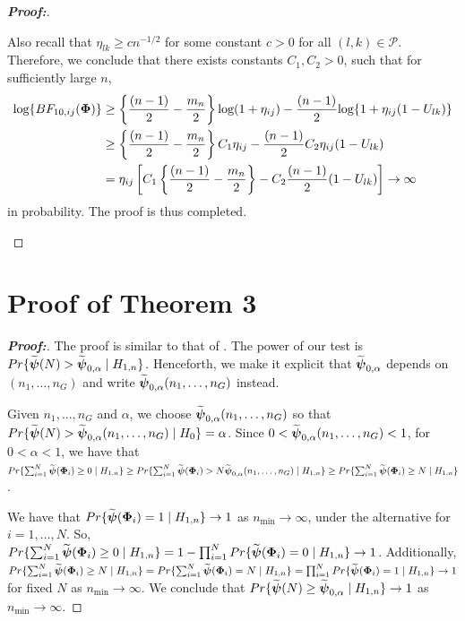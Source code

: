 \documentclass[pdflatex,sn-basic]{sn-jnl}%
\def\log{\hbox{log}}
\def\log{\hbox{log}}
\def\boldpsi{{\mbox{\boldmath $\psi$}}}
\newcommand{\uPhi}              {\mbox{\boldmath$\Phi$}}
\theoremstyle{thmstyleone}%
\theoremstyle{thmstyletwo}%
\theoremstyle{thmstylethree}%
\begin{document}
\begin{appendices}
\begin{proof}[\textbf{\upshape Proof:}]
\begin{description}
{Also recall that $\eta_{lk} \geq cn^{-1/2}$ for some constant $c > 0$ for all $(l,k)\in\mathcal{P}$. Therefore, we conclude that there exists constants $C_1, C_2 > 0$, such that for sufficiently large $n$,
\begin{align*}
    \log\{BF_{10, ij}(\uPhi) \} & \geq \left\{\frac{(n - 1)}{2} - \frac{m_n}{2}\right\}\log(1 + \eta_{ij}) - \frac{(n - 1)}{2}\log\{1 + \eta_{ij}(1 - U_{lk})\}\\
    &\geq \left\{\frac{(n - 1)}{2} - \frac{m_n}{2}\right\}C_1\eta_{ij} - \frac{(n - 1)}{2}C_2\eta_{ij}(1 - U_{lk})\\
    & = \eta_{ij}\left[C_1\left\{\frac{(n - 1)}{2} - \frac{m_n}{2}\right\} - C_2\frac{(n - 1)}{2}(1 - U_{lk})\right]\to \infty
\end{align*}
in probability. The proof is thus completed. 
}

\end{description}
\end{proof}


\section{Proof of Theorem 3} \label{secA2}

\begin{proof}[\textbf{\upshape Proof:}]
The proof is similar to that of \cite{zoh2018powerful}. %
The power of our test is $Pr\{ \widetilde{\boldpsi}(N) > \widetilde{\boldpsi}_{0,\alpha}\mid  H_{1,n}\}$.
Henceforth, we make it explicit that $\widetilde{\boldpsi}_{0,\alpha}$ depends on $(n_1, \ldots ,n_G)$ and write $\widetilde{\boldpsi}_{0,\alpha}(n_1, \ldots, n_G)$ instead.

Given $n_1, \ldots, n_G$ and $\alpha$, we choose $\widetilde{\boldpsi}_{0,\alpha}(n_1, \ldots, n_G)$ so that $Pr\{\widetilde{\boldpsi}(N) > \widetilde{\boldpsi}_{0, \alpha}(n_1, \ldots,n_G)\mid  H_{0}\}  = \alpha$.
Since $ 0 < \widetilde{\boldpsi}_{0,\alpha}(n_1, \ldots,n_G) < 1$, for $0 < \alpha < 1$, we have that $Pr\{ \sum^{N}_{i=1}\widetilde{\boldpsi}(\uPhi_i) \geq 0 \mid H_{1,n} \} \geq Pr\{ \sum^{N}_{i=1}\widetilde{\boldpsi}(\uPhi_i) > N\widetilde{\boldpsi}_{0,\alpha}(n_1, \ldots ,n_G) \mid H_{1,n} \} \geq Pr\{ \sum^{N}_{i=1}\widetilde{\boldpsi}(\uPhi_i) \geq N \mid H_{1,n} \}$.

We have that $Pr\{\widetilde{\boldpsi}(\uPhi_i) =1 \mid H_{1,n}\} \rightarrow 1$ as $n_{\min} \rightarrow \infty$, under the alternative for $i = 1, \ldots, N$. So, $Pr\{ \sum^{N}_{i=1}\widetilde{\boldpsi}(\uPhi_i) \geq 0 \mid H_{1,n} \} = 1 - \prod_{i=1}^{N}Pr\{\widetilde{\boldpsi}(\uPhi_i) = 0 \mid H_{1,n} \} \rightarrow 1$.
Additionally, $Pr\{ \sum^{N}_{i=1}\widetilde{\boldpsi}(\uPhi_i) \geq N \mid H_{1,n} \} = Pr\{ \sum^{N}_{i=1}\widetilde{\boldpsi}(\uPhi_i) = N \mid H_{1,n} \} = \prod_{i=1}^{N}Pr\{\widetilde{\boldpsi}(\uPhi_i) = 1 \mid H_{1,n}\} \rightarrow 1$ for fixed $N$ as $n_{\min} \rightarrow \infty$. We conclude that $Pr\{ \widetilde{\boldpsi}(N) \geq \widetilde{\boldpsi}_{0, \alpha}\mid  H_{1,n}\} \rightarrow 1$ as $n_{\min} \rightarrow \infty.$
\end{proof}


\end{appendices}
\end{document}
